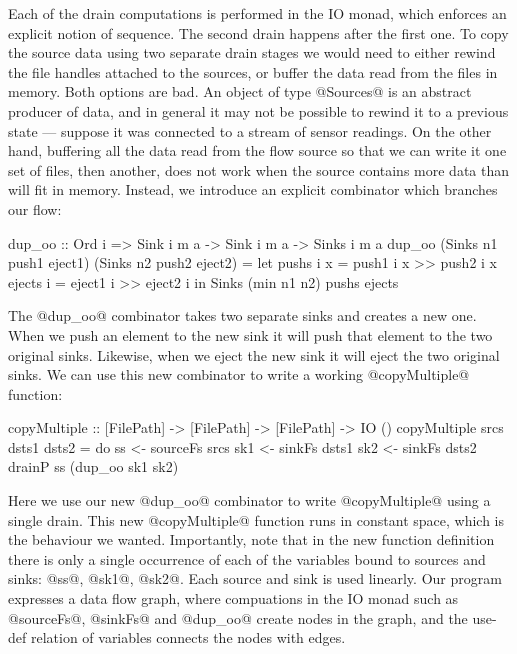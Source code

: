 Each of the drain computations is performed in the IO monad, which enforces an explicit notion of sequence. The second drain happens after the first one. To copy the source data using two separate drain stages we would need to either rewind the file handles attached to the sources, or buffer the data read from the files in memory. Both options are bad. An object of type @Sources@ is an abstract producer of data, and in general it may not be possible to rewind it to a previous state --- suppose it was connected to a stream of sensor readings. On the other hand, buffering all the data read from the flow source so that we can write it one set of files, then another, does not work when the source contains more data than will fit in memory. Instead, we introduce an explicit combinator which branches our flow:

\begin{code}
 dup_oo :: Ord i 
        => Sink i m a -> Sink i m a -> Sinks i m a
 dup_oo (Sinks n1 push1 eject1) 
        (Sinks n2 push2 eject2)
  = let pushs  i x = push1 i x >> push2 i x
        ejects i   = eject1 i  >> eject2 i
    in  Sinks (min n1 n2) pushs ejects
\end{code}

The @dup_oo@ combinator takes two separate sinks and creates a new one. When we push an element to the new sink it will push that element to the two original sinks. Likewise, when we eject the new sink it will eject the two original sinks. We can use this new combinator to write a working @copyMultiple@ function:

\begin{code}
 copyMultiple 
  :: [FilePath] -> [FilePath] -> [FilePath] -> IO ()
 copyMultiple srcs dsts1 dsts2
  = do  ss  <- sourceFs srcs
        sk1 <- sinkFs   dsts1
        sk2 <- sinkFs   dsts2 
        drainP ss (dup_oo sk1 sk2)
\end{code}

Here we use our new @dup_oo@ combinator to write @copyMultiple@ using a single drain. This new @copyMultiple@ function runs in constant space, which is the behaviour we wanted. Importantly, note that in the new function definition there is only a single occurrence of each of the variables bound to sources and sinks: @ss@, @sk1@, @sk2@. Each source and sink is used linearly. Our program expresses a data flow graph, where compuations in the IO monad such as @sourceFs@, @sinkFs@ and @dup_oo@ create nodes in the graph, and the use-def relation of variables connects the nodes with edges.




